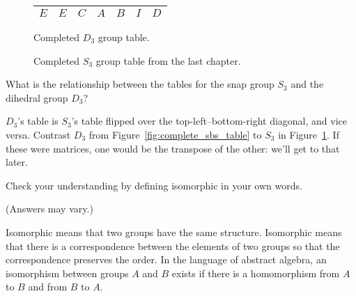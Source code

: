 \documentclass[../gatm_answers.tex]{subfiles}
\begin{document}
\begin{figure}[h]
\begin{center}
\begin{minipage}[b]{0.45\textwidth}
\begin{tabular}{c|cccccc}
				$E$ & $E$ & $C$ & $A$ & $B$ & $I$ & $D$ \\ \hline
			\end{tabular}
			\vspace*{0.5\baselineskip}
		\end{minipage}
	\end{center}
	\vspace*{-2\baselineskip}
	\begin{center}
		\begin{minipage}[t]{0.45\textwidth}
			\caption{Completed $D_3$ group table.}
			\label{fig:complete_sbs_table}
		\end{minipage}
		\hfill
		\begin{minipage}[t]{0.45\textwidth}
			\caption{Completed $S_3$ group table from the last chapter.}
			\label{fig:complete_sts_table}
		\end{minipage}
	\end{center}
	\vspace*{-2\baselineskip}
\end{figure}

\begin{outer_problem}
\item What is the relationship between the tables for the snap group $S_3$ and the dihedral group $D_3$?
\end{outer_problem}

\noindent$D_3$'s table is $S_3$'s table flipped over the top-left--bottom-right diagonal, and vice versa. Contrast $D_3$ from Figure~\ref{fig:complete_sbs_table} to $S_3$ in Figure~\ref{fig:complete_sts_table}. If these were matrices, one would be the transpose of the other: we'll get to that later.

\begin{outer_problem}
\item Check your understanding by defining isomorphic in your own words.
\end{outer_problem}

\noindent (Answers may vary.)

Isomorphic means that two groups have the same structure.
Isomorphic means that there is a correspondence between the elements of two groups so that the correspondence preserves the order.
In the language of abstract algebra, an isomorphism between groups $A$ and $B$ exists if there is a homomorphism from $A$ to $B$ and from $B$ to $A$.
\end{document}
